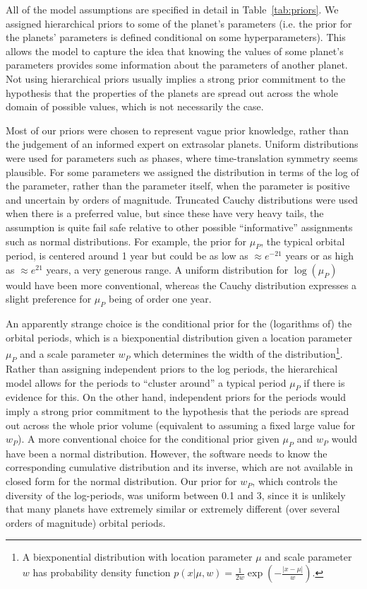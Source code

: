 \documentclass[useAMS,usenatbib]{mn2e}
\begin{document}
All of the model assumptions are specified in detail in
Table~\ref{tab:priors}. We assigned hierarchical priors to some of the planet's
parameters (i.e. the prior for the planets' parameters is defined conditional
on some hyperparameters). This allows the
model to capture the idea that knowing the values of some planet's parameters
provides some information about the parameters of another planet. Not using
hierarchical priors usually implies a strong prior commitment to the hypothesis
that the properties of the planets are spread out across the whole domain of
possible values, which is not necessarily the case.

Most of our priors were chosen to represent vague
prior knowledge, rather than the judgement of an informed expert on extrasolar
planets. Uniform distributions were used for parameters such as phases, where
time-translation symmetry seems plausible. For some parameters we assigned the
distribution in terms of the log of the parameter, rather than the parameter
itself, when the parameter is positive and uncertain by orders of magnitude.
Truncated Cauchy distributions were used when there is a
preferred value, but since these have very heavy tails, the assumption is
quite fail safe relative to other possible ``informative'' assignments such as normal distributions.
For example, the prior for $\mu_P$, the typical orbital period,
is centered around 1 year but could be as low as $\approx e^{-21}$ years or as high
as $\approx e^{21}$ years, a very generous range. A uniform distribution for
$\log(\mu_P)$ would have been more conventional, whereas the Cauchy distribution
expresses a slight preference for $\mu_P$ being of order one year.

An apparently strange choice is the conditional prior for the (logarithms of)
the orbital
periods, which is a biexponential distribution given a location parameter
$\mu_P$ and a scale parameter $w_P$ which determines the width of the
distribution\footnote{A biexponential distribution with location parameter
$\mu$ and scale parameter $w$ has probability density function
$p(x|\mu, w) = \frac{1}{2w} \exp\left(-\frac{|x - \mu|}{w}\right)$.}.
Rather than assigning independent priors to the log periods, the hierarchical
model allows for the periods to ``cluster around'' a typical period $\mu_P$ if
there is evidence for this. On the other hand, independent priors for the
periods would imply a strong prior commitment to the hypothesis that the
periods are spread out across the whole prior volume (equivalent to assuming
a fixed large value for $w_P$).
A more conventional choice for the conditional prior given $\mu_P$ and $w_P$
would have been a normal distribution. However, the \citet{rjobject} software
needs to know the corresponding cumulative distribution and its inverse, which
are not available in closed form for the normal distribution.
Our prior for $w_P$, which controls the diversity of the log-periods, was
uniform between 0.1 and 3, since it is unlikely that many planets have
extremely similar or extremely different (over several orders of magnitude)
orbital periods.
\end{document}
